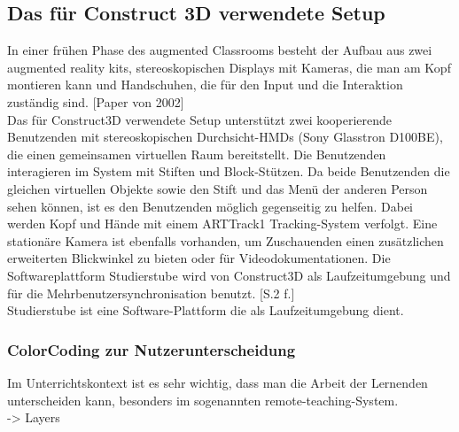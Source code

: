 \documentclass[deutsch]{llncs}
\begin{document}
\subsection{Das für Construct 3D verwendete Setup}
\label{subsec:}
In einer frühen Phase des augmented Classrooms besteht der Aufbau aus zwei augmented reality kits, stereoskopischen Displays mit Kameras, die man am Kopf montieren kann und Handschuhen, die für den Input und die Interaktion zuständig sind. \cite{Kaufmann:2002:MGE:1242073.1242086} [Paper von 2002]
\noindent \\
Das für Construct3D verwendete Setup unterstützt zwei kooperierende Benutzenden mit stereoskopischen Durchsicht-HMDs 
(Sony Glasstron D100BE), die einen gemeinsamen virtuellen Raum bereitstellt. Die Benutzenden interagieren im System mit Stiften und Block-Stützen. 
Da beide Benutzenden die gleichen virtuellen Objekte sowie den Stift und das Menü der anderen Person sehen können, ist es den Benutzenden möglich 
gegenseitig zu helfen. Dabei werden Kopf und Hände mit einem ARTTrack1 Tracking-System verfolgt. Eine stationäre Kamera ist ebenfalls vorhanden, um Zuschauenden
einen zusätzlichen erweiterten Blickwinkel zu bieten oder für Videodokumentationen. Die Softwareplattform Studierstube wird von Construct3D als 
Laufzeitumgebung und für die Mehrbenutzersynchronisation benutzt. [S.2 f.]\\
Studierstube ist eine Software-Plattform die als Laufzeitumgebung dient. 
\subsubsection{ColorCoding zur Nutzerunterscheidung} 
Im Unterrichtskontext ist es sehr wichtig, dass man die Arbeit der Lernenden unterscheiden kann, besonders im sogenannten remote-teaching-System. \\
-> Layers
\end{document}
